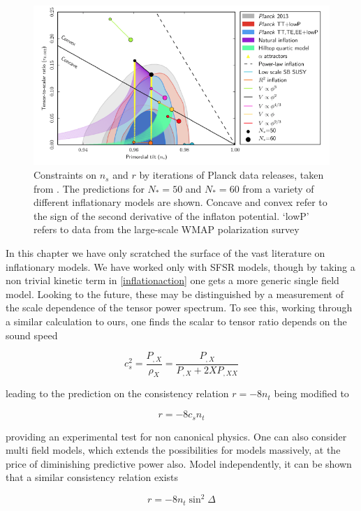 \documentclass[a4paper,10pt]{article}
\begin{document}
\begin{figure}[h]
  \includegraphics[width=0.7\linewidth]{modeldepconstraints.png}
  \centering
  \caption{Constraints on $n_s$ and $r$ by iterations of Planck data releases, taken from \cite{QBM}. The predictions for $N_*=50$ and $N_*=60$ from a variety of different inflationary models are shown. Concave and convex refer to the sign of the second derivative of the inflaton potential. `lowP' refers to data from the large-scale WMAP polarization survey}
\label{inflationconstraints}  
\end{figure}


In this chapter we have only scratched the surface of the vast literature on inflationary models. We have worked only with SFSR models, though by taking a non trivial kinetic term in \ref{inflationaction} one gets a more generic single field model. Looking to the future, these may be distinguished by a measurement of the scale dependence of the tensor power spectrum. To see this, working through a similar calculation to ours, one finds the scalar to tensor ratio depends on the sound speed

\begin{equation}
c_s^2 = \frac{P_{,X}}{\rho_X} = \frac{P_{,X}}{P_{,X}+2XP_{,XX}}
\end{equation}

leading to the prediction on the consistency relation $r=-8n_t$ being modified to 

\begin{equation}
r=-8c_sn_t
\end{equation}

providing an experimental test for non canonical physics. One can also consider multi field models, which extends the possibilities for models massively, at the price of diminishing predictive power also. Model independently, it can be shown that a similar consistency relation exists

\begin{equation}
r=-8n_t\sin^2\Delta
\end{equation}
\end{document}
